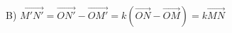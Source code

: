 \documentclass[preview]{standalone}
\begin{document}
\begin{center}
B) $\overrightarrow{M'N'}=\overrightarrow{ON'}-\overrightarrow{OM'}=k(\overrightarrow{ON}-\overrightarrow{OM})=k\overrightarrow{MN}$
\end{center}
\end{document}
